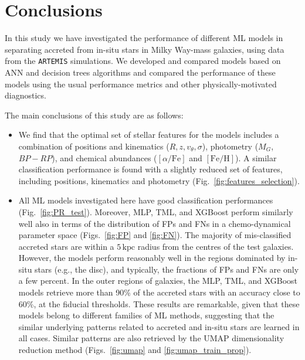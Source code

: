 \section{Conclusions}
\label{sec:conclusions}

In this study we have investigated the performance of different ML models in separating accreted from in-situ stars in Milky Way-mass galaxies, using data from the \texttt{ARTEMIS} simulations. We developed and compared models based on ANN and decision trees algorithms and compared the performance of these models using the usual performance metrics and other physically-motivated diagnostics.

The main conclusions of this study are as follows:

\begin{itemize}

    \item We find that the optimal set of stellar features for the models includes a combination of positions and kinematics ($R, z, v_{\theta}, \sigma$), photometry ($M_{G}$, $BP-RP$), and chemical abundances ($[\alpha/\mathrm{Fe}]$ and $[\mathrm{Fe}/\mathrm{H}]$). A similar classification performance is found with a slightly reduced set of features, including positions, kinematics and photometry (Fig.~\ref{fig:features_selection}).

    \item All ML models investigated here have good classification performances (Fig.~\ref{fig:PR_test}). Moreover, MLP, TML, and XGBoost perform similarly well also in terms of the distribution of FPs and FNs in a chemo-dynamical parameter space (Figs.~\ref{fig:FP} and \ref{fig:FN}). The majority of mis-classified accreted stars are within a $5 \, \mathrm{kpc}$ radius from the centres of the test galaxies. However, the models perform reasonably well in the regions dominated by in-situ stars (e.g., the disc), and typically, the fractions of FPs and FNs are only a few percent. In the outer regions of galaxies, the MLP, TML, and XGBoost models retrieve more than 90\% of the accreted stars with an accuracy close to 60\%, at the fiducial thresholds. These results are remarkable, given that these models belong to different families of ML methods, suggesting that the similar underlying patterns related to accreted and in-situ stars are learned in all cases. Similar patterns are also retrieved by the UMAP dimensionality reduction method (Figs.~\ref{fig:umap} and \ref{fig:umap_train_prop}).


\end{itemize}
